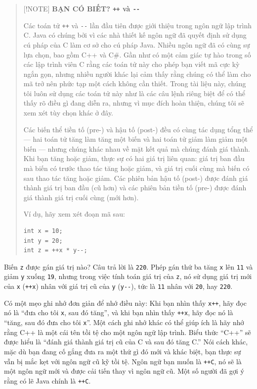 \begin{quote}
{[}!NOTE{]} \textbf{BẠN CÓ BIẾT? \texttt{++} và \texttt{-\/-}}

Các toán tử \texttt{++} và \texttt{-\/-} lần đầu tiên được giới thiệu
trong ngôn ngữ lập trình C. Java có chúng bởi vì các nhà thiết kế ngôn
ngữ đã quyết định sử dụng cú pháp của C làm cơ sở cho cú pháp Java.
Nhiều ngôn ngữ đã có cùng sự lựa chọn, bao gồm C++ và C\#. Gần như có
một cảm giác tự hào trong số các lập trình viên C rằng các toán tử này
cho phép bạn viết mã cực kỳ ngắn gọn, nhưng nhiều người khác lại cảm
thấy rằng chúng có thể làm cho mã trở nên phức tạp một cách không cần
thiết. Trong tài liệu này, chúng tôi luôn sử dụng các toán tử này như là
các câu lệnh riêng biệt để có thể thấy rõ điều gì đang diễn ra, nhưng vì
mục đích hoàn thiện, chúng tôi sẽ xem xét tùy chọn khác ở đây.

Các biến thể tiền tố (pre-) và hậu tố (post-) đều có cùng tác dụng tổng
thể --- hai toán tử tăng làm tăng một biến và hai toán tử giảm làm giảm
một biến --- nhưng chúng khác nhau về mặt kết quả mà chúng đánh giá
thành. Khi bạn tăng hoặc giảm, thực sự có hai giá trị liên quan: giá trị
ban đầu mà biến có trước thao tác tăng hoặc giảm, và giá trị cuối cùng
mà biến có sau thao tác tăng hoặc giảm. Các phiên bản hậu tố (post-)
được đánh giá thành giá trị ban đầu (cũ hơn) và các phiên bản tiền tố
(pre-) được đánh giá thành giá trị cuối cùng (mới hơn).

Ví dụ, hãy xem xét đoạn mã sau:

\begin{verbatim}
int x = 10;
int y = 20;
int z = ++x * y--;
\end{verbatim}
\end{quote}

Biến \texttt{z} được gán giá trị nào? Câu trả lời là \texttt{220}. Phép
gán thứ ba tăng \texttt{x} lên \texttt{11} và giảm \texttt{y} xuống
\texttt{19}, nhưng trong việc tính toán giá trị của \texttt{z}, nó sử
dụng giá trị mới của \texttt{x} (\texttt{++x}) nhân với giá trị cũ của
\texttt{y} (\texttt{y-\/-}), tức là \texttt{11} nhân với \texttt{20},
hay \texttt{220}.

Có một mẹo ghi nhớ đơn giản để nhớ điều này: Khi bạn nhìn thấy
\texttt{x++}, hãy đọc nó là ``đưa cho tôi \texttt{x}, sau đó tăng'', và
khi bạn nhìn thấy \texttt{++x}, hãy đọc nó là ``tăng, sau đó đưa cho tôi
\texttt{x}''. Một cách ghi nhớ khác có thể giúp ích là hãy nhớ rằng C++
là một cái tên tồi tệ cho một ngôn ngữ lập trình. Biểu thức ``C++'' sẽ
được hiểu là ``đánh giá thành giá trị cũ của C và sau đó tăng C.'' Nói
cách khác, mặc dù bạn đang cố gắng đưa ra một thứ gì đó mới và khác
biệt, bạn thực sự vẫn bị mắc kẹt với ngôn ngữ cũ kỹ tồi tệ. Ngôn ngữ bạn
muốn là \texttt{++C}, nó sẽ là một ngôn ngữ mới và được cải tiến thay vì
ngôn ngữ cũ. Một số người đã gợi ý rằng có lẽ Java chính là
\texttt{++C}.

